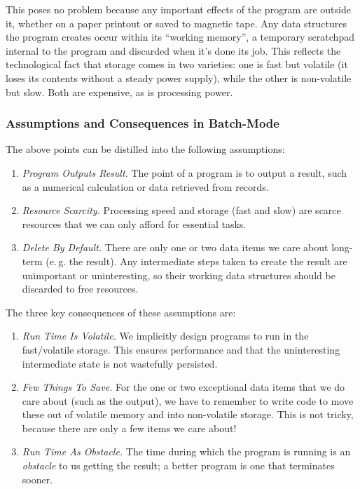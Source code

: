 \documentclass[ twoside,openright,titlepage,numbers=noenddot,headinclude,footinclude,cleardoublepage=empty,abstract=on,
                BCOR=5mm,paper=a4,fontsize=11pt
                ]{scrreprt}
\newcommand{\eg}{e.\,g.}
\providecommand{\tightlist}{}\newenvironment{longtable}[2]{\begin{tabular}}{\end{tabular}}
\theoremstyle{definition}
\begin{document}
This poses no problem because any important effects of the program are
outside it, whether on a paper printout or saved to magnetic tape. Any
data structures the program creates occur within its ``working memory'',
a temporary scratchpad internal to the program and discarded when it's
done its job. This reflects the technological fact that storage comes in
two varieties: one is fast but volatile (it loses its contents without a
steady power supply), while the other is non-volatile but slow. Both are
expensive, as is processing power.

\hypertarget{assumptions-and-consequences-in-batch-mode}{\subsubsection{Assumptions and Consequences in
Batch-Mode}\label{assumptions-and-consequences-in-batch-mode}}

The above points can be distilled into the following assumptions:

\begin{enumerate}
\def\labelenumi{\arabic{enumi}.}
\tightlist
\item
  \emph{Program Outputs Result.} The point of a program is to output a
  result, such as a numerical calculation or data retrieved from
  records.
\item
  \emph{Resource Scarcity.} Processing speed and storage (fast and slow)
  are scarce resources that we can only afford for essential tasks.
\item
  \emph{Delete By Default.} There are only one or two data items we care
  about long-term (\eg{} the result). Any intermediate steps taken to
  create the result are unimportant or uninteresting, so their working
  data structures should be discarded to free resources.
\end{enumerate}

The three key consequences of these assumptions are:

\begin{enumerate}
\def\labelenumi{\arabic{enumi}.}
\tightlist
\item
  \emph{Run Time Is Volatile.} We implicitly design programs to run in
  the fast/volatile storage. This ensures performance and that the
  uninteresting intermediate state is not wastefully persisted.
\item
  \emph{Few Things To Save.} For the one or two exceptional data items
  that we do care about (such as the output), we have to remember to
  write code to move these out of volatile memory and into non-volatile
  storage. This is not tricky, because there are only a few items we
  care about!
\item
  \emph{Run Time As Obstacle.} The time during which the program is
  running is an \emph{obstacle} to us getting the result; a better
  program is one that terminates sooner.
\end{enumerate}
\end{document}
